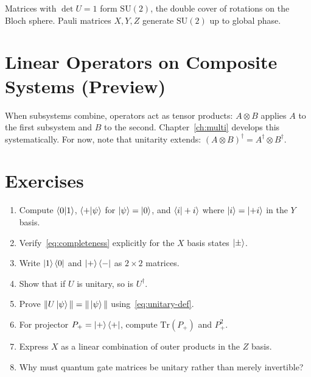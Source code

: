 Matrices with $\det U=1$ form $\mathrm{SU}(2)$, the double cover of rotations on the Bloch sphere. Pauli matrices $X,Y,Z$ generate $\mathrm{SU}(2)$ up to global phase.

\section{Linear Operators on Composite Systems (Preview)}
\label{sec:tensor-preview}

When subsystems combine, operators act as tensor products: $A\otimes B$ applies $A$ to the first subsystem and $B$ to the second. Chapter~\ref{ch:multi} develops this systematically. For now, note that unitarity extends: $(A\otimes B)^\dagger=A^\dagger\otimes B^\dagger$.

\section*{Exercises}
\begin{enumerate}[label=\arabic*.]
\item Compute $\braket{0|1}$, $\braket{+|\psi}$ for $\ket{\psi}=\ket{0}$, and $\braket{i|+i}$ where $\ket{i}=\ket{+i}$ in the $Y$ basis.
\item Verify~\eqref{eq:completeness} explicitly for the $X$ basis states $\ket{\pm}$.
\item Write $\ket{1}\bra{0}$ and $\ket{+}\bra{-}$ as $2\times 2$ matrices.
\item Show that if $U$ is unitary, so is $U^\dagger$.
\item Prove $\|U\ket{\psi}\|=\|\ket{\psi}\|$ using~\eqref{eq:unitary-def}.
\item For projector $P_+=\ket{+}\bra{+}$, compute $\mathrm{Tr}(P_+)$ and $P_+^2$.
\item Express $X$ as a linear combination of outer products in the $Z$ basis.
\item Why must quantum gate matrices be unitary rather than merely invertible?
\end{enumerate}
